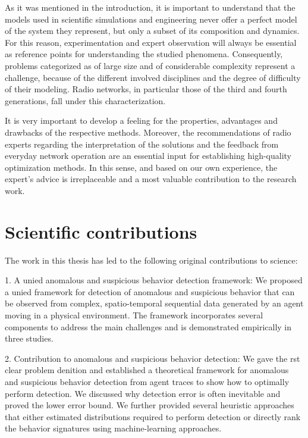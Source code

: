 As it was mentioned in the introduction, it is important to understand
that the models used in scientific simulations and engineering never
offer a perfect model of the system they represent, but only a subset
of its composition and dynamics. For this reason, experimentation
and expert observation will always be essential as reference points
for understanding the studied phenomena. Consequently, problems categorized
as of large size and of considerable complexity represent a challenge,
because of the different involved disciplines and the degree of difficulty
of their modeling. Radio networks, in particular those of the third
and fourth generations, fall under this characterization.

It is very important to develop a feeling for the properties, advantages
and drawbacks of the respective methods. Moreover, the recommendations
of radio experts regarding the interpretation of the solutions and
the feedback from everyday network operation are an essential input
for establishing high-quality optimization methods. In this sense,
and based on our own experience, the expert's advice is irreplaceable
and a most valuable contribution to the research work.


\section{Scientific contributions}



The work in this thesis has led to the following original contributions
to science: 

1. A unied anomalous and suspicious behavior detection framework:
We proposed a unied framework for detection of anomalous and suspicious
behavior that can be observed from complex, spatio-temporal sequential
data generated by an agent moving in a physical environment. The framework
incorporates several components to address the main challenges and
is demonstrated empirically in three studies. 

2. Contribution to anomalous and suspicious behavior detection: We
gave the rst clear problem denition and established a theoretical
framework for anomalous and suspicious behavior detection from agent
traces to show how to optimally perform detection. We discussed why
detection error is often inevitable and proved the lower error bound.
We further provided several heuristic approaches that either estimated
distributions required to perform detection or directly rank the behavior
signatures using machine-learning approaches. 




